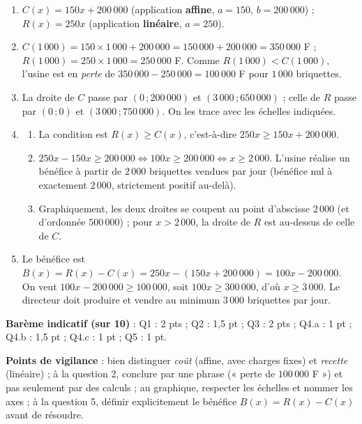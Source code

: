 \documentclass[11pt]{article}
\begin{document}
\begin{corrige}
\begin{enumerate}
\item $C(x)=150x+200\,000$ (application \textbf{affine}, $a=150$, $b=200\,000$) ; $R(x)=250x$ (application \textbf{linéaire}, $a=250$).
\item $C(1\,000)=150\times 1\,000+200\,000=150\,000+200\,000=350\,000$ F ; $R(1\,000)=250\times 1\,000=250\,000$ F. Comme $R(1\,000)<C(1\,000)$, l'usine est en \emph{perte} de $350\,000-250\,000=100\,000$ F pour $1\,000$ briquettes.
\item La droite de $C$ passe par $(0\,;200\,000)$ et $(3\,000\,;650\,000)$ ; celle de $R$ passe par $(0\,;0)$ et $(3\,000\,;750\,000)$. On les trace avec les échelles indiquées.
\item \begin{enumerate}
\item La condition est $R(x)\ge C(x)$, c'est-à-dire $250x\ge 150x+200\,000$.
\item $250x-150x\ge 200\,000 \iff 100x\ge 200\,000 \iff x\ge 2\,000$. L'usine réalise un bénéfice à partir de $2\,000$ briquettes vendues par jour (bénéfice nul à exactement $2\,000$, strictement positif au-delà).
\item Graphiquement, les deux droites se coupent au point d'abscisse $2\,000$ (et d'ordonnée $500\,000$) ; pour $x>2\,000$, la droite de $R$ est au-dessus de celle de $C$.
\end{enumerate}
\item Le bénéfice est $B(x)=R(x)-C(x)=250x-(150x+200\,000)=100x-200\,000$. On veut $100x-200\,000\ge 100\,000$, soit $100x\ge 300\,000$, d'où $x\ge 3\,000$. Le directeur doit produire et vendre au minimum $3\,000$ briquettes par jour.
\end{enumerate}

\textbf{Barème indicatif (sur 10)} : Q1 : 2 pts ; Q2 : 1,5 pt ; Q3 : 2 pts ; Q4.a : 1 pt ; Q4.b : 1,5 pt ; Q4.c : 1 pt ; Q5 : 1 pt.

\textbf{Points de vigilance} : bien distinguer \emph{coût} (affine, avec charges fixes) et \emph{recette} (linéaire) ; à la question 2, conclure par une phrase (« perte de $100\,000$ F ») et pas seulement par des calculs ; au graphique, respecter les échelles et nommer les axes ; à la question 5, définir explicitement le bénéfice $B(x)=R(x)-C(x)$ avant de résoudre.
\end{corrige}
\end{document}
